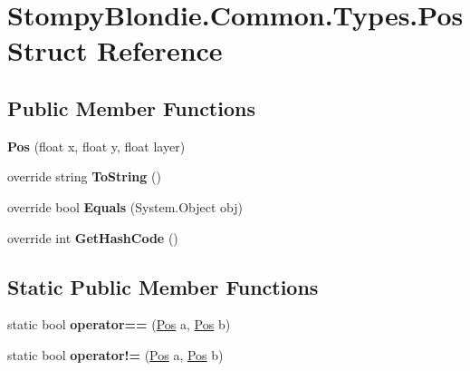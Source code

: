 \hypertarget{struct_stompy_blondie_1_1_common_1_1_types_1_1_pos}{}\section{Stompy\+Blondie.\+Common.\+Types.\+Pos Struct Reference}
\label{struct_stompy_blondie_1_1_common_1_1_types_1_1_pos}
\subsection*{Public Member Functions}
\begin{DoxyCompactItemize}
\item 
\mbox{\label{struct_stompy_blondie_1_1_common_1_1_types_1_1_pos_a799bf0737c9061d2d085c8585b11e1eb}} 
{\bfseries Pos} (float x, float y, float layer)
\item 
\mbox{\label{struct_stompy_blondie_1_1_common_1_1_types_1_1_pos_a86fe2f5e48eb144cb37807dbaf4a7ac4}} 
override string {\bfseries To\+String} ()
\item 
\mbox{\label{struct_stompy_blondie_1_1_common_1_1_types_1_1_pos_a6f2f34f43731202a1eb218a230fc1c8c}} 
override bool {\bfseries Equals} (System.\+Object obj)
\item 
\mbox{\label{struct_stompy_blondie_1_1_common_1_1_types_1_1_pos_aa60271bf962645b90a74d140b1086ffd}} 
override int {\bfseries Get\+Hash\+Code} ()
\end{DoxyCompactItemize}
\subsection*{Static Public Member Functions}
\begin{DoxyCompactItemize}
\item 
\mbox{\label{struct_stompy_blondie_1_1_common_1_1_types_1_1_pos_ab97b703ef32c20b8884efaf126c70361}} 
static bool {\bfseries operator==} (\mbox{\hyperlink{struct_stompy_blondie_1_1_common_1_1_types_1_1_pos}{Pos}} a, \mbox{\hyperlink{struct_stompy_blondie_1_1_common_1_1_types_1_1_pos}{Pos}} b)
\item 
\mbox{\label{struct_stompy_blondie_1_1_common_1_1_types_1_1_pos_a4972b4ecc4fd560fc31613e687016dbe}} 
static bool {\bfseries operator!=} (\mbox{\hyperlink{struct_stompy_blondie_1_1_common_1_1_types_1_1_pos}{Pos}} a, \mbox{\hyperlink{struct_stompy_blondie_1_1_common_1_1_types_1_1_pos}{Pos}} b)
\end{DoxyCompactItemize}
